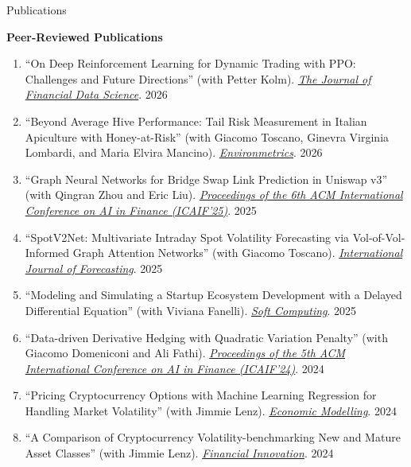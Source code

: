 \documentclass{resume} %
\begin{document}
\begin{rSection}{Publications}

{\bf Peer-Reviewed Publications} \\[0.3em]
\begin{enumerate}[leftmargin=1.9em,itemsep=0.45em,topsep=0.15em,label=\arabic*.]
\item ``On Deep Reinforcement Learning for Dynamic Trading with PPO: Challenges and Future Directions'' (with Petter Kolm). \href{https://doi.org/10.3905/jfds.2026.001}{\emph{The Journal of Financial Data Science}}. \hfill 2026
\item ``Beyond Average Hive Performance: Tail Risk Measurement in Italian Apiculture with Honey-at-Risk'' (with Giacomo Toscano, Ginevra Virginia Lombardi, and Maria Elvira Mancino). \href{https://doi.org/10.1002/env.70106}{\emph{Environmetrics}}. \hfill 2026
\item ``Graph Neural Networks for Bridge Swap Link Prediction in Uniswap v3'' (with Qingran Zhou and Eric Liu). \href{https://doi.org/10.1145/3768292.3770392}{\emph{Proceedings of the 6th ACM International Conference on AI in Finance (ICAIF'25)}}. \hfill 2025
\item ``SpotV2Net: Multivariate Intraday Spot Volatility Forecasting via Vol-of-Vol-Informed Graph Attention Networks'' (with Giacomo Toscano). \href{https://doi.org/10.1016/j.ijforecast.2024.11.004}{\emph{International Journal of Forecasting}}. \hfill 2025
\item ``Modeling and Simulating a Startup Ecosystem Development with a Delayed Differential Equation'' (with Viviana Fanelli). \href{https://doi.org/10.1007/s00500-025-10565-4}{\emph{Soft Computing}}. \hfill 2025
\item ``Data-driven Derivative Hedging with Quadratic Variation Penalty'' (with Giacomo Domeniconi and Ali Fathi). \href{https://doi.org/10.1145/3677052.3698664}{\emph{Proceedings of the 5th ACM International Conference on AI in Finance (ICAIF'24)}}. \hfill 2024
\item ``Pricing Cryptocurrency Options with Machine Learning Regression for Handling Market Volatility'' (with Jimmie Lenz). \href{https://doi.org/10.1016/j.econmod.2024.106752}{\emph{Economic Modelling}}. \hfill 2024
\item ``A Comparison of Cryptocurrency Volatility-benchmarking New and Mature Asset Classes'' (with Jimmie Lenz). \href{https://doi.org/10.1186/s40854-024-00646-y}{\emph{Financial Innovation}}. \hfill 2024

\end{enumerate}
\end{rSection}
\end{document}
